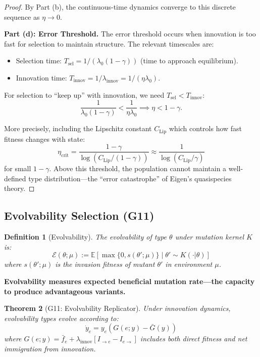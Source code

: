 \documentclass[12pt]{article}
\newtheorem{theorem}{Theorem}[section]
\newtheorem{definition}[theorem]{Definition}
\newcommand{\E}{\mathbb{E}}
\newcommand{\added}[1]{\textbf{#1}}
\begin{document}
\begin{proof}
By Part (b), the continuous-time dynamics converge to this discrete sequence as $\eta \to 0$.

\textbf{Part (d): Error Threshold.}
The error threshold occurs when innovation is too fast for selection to maintain structure. The relevant timescales are:
\begin{itemize}
    \item Selection time: $T_{\text{sel}} = 1/(\lambda_0 (1 - \gamma))$ (time to approach equilibrium).
    \item Innovation time: $T_{\text{innov}} = 1/\lambda_{\text{innov}} = 1/(\eta \lambda_0)$.
\end{itemize}

For selection to ``keep up'' with innovation, we need $T_{\text{sel}} < T_{\text{innov}}$:
\[
\frac{1}{\lambda_0(1 - \gamma)} < \frac{1}{\eta \lambda_0} \implies \eta < 1 - \gamma.
\]

More precisely, including the Lipschitz constant $C_{\text{Lip}}$ which controls how fast fitness changes with state:
\[
\eta_{\text{crit}} = \frac{1 - \gamma}{\log(C_{\text{Lip}} / (1 - \gamma))} \approx \frac{1}{\log(C_{\text{Lip}} / \gamma)}
\]
for small $1 - \gamma$. Above this threshold, the population cannot maintain a well-defined type distribution---the ``error catastrophe'' of Eigen's quasispecies theory.
\end{proof}

\subsection{Evolvability Selection (G11)}

\begin{definition}[Evolvability]
The \emph{evolvability} of type $\theta$ under mutation kernel $K$ is:
\[
\mathcal{E}(\theta; \mu) := \E\left[ \max\{0, s(\theta'; \mu)\} \mid \theta' \sim K(\cdot | \theta) \right]
\]
where $s(\theta'; \mu)$ is the invasion fitness of mutant $\theta'$ in environment $\mu$.
\end{definition}

\added{\textbf{Evolvability measures expected beneficial mutation rate---the capacity to produce advantageous variants.}}

\begin{theorem}[G11: Evolvability Replicator]
\label{thm:g11}
Under innovation dynamics, evolvability types evolve according to:
\[
\dot{y}_e = y_e \left( G(e; y) - \bar{G}(y) \right)
\]
where $G(e; y) = \bar{f}_e + \lambda_{\mathrm{innov}}[I_{\to e} - I_{e \to}]$ includes both direct fitness and net immigration from innovation.
\end{theorem}
\end{document}

